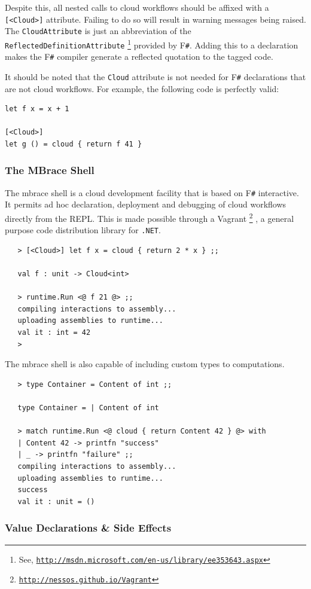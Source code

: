 \documentclass[9pt,a4paper]{article}
\newcommand{\mbrace}{mbrace}
\newcommand{\TitularMbrace}{MBrace}
\newcommand{\fsharp}{F\texttt \#}
\newcommand{\dotnet}{\texttt{\hbox{.}NET}}
\newcommand{\samehref}[1]{\href{#1}{\texttt{#1}}}
\begin{document}
Despite this, all nested calls to cloud workflows should be affixed with a \texttt{[<Cloud>]}
attribute. Failing to do so will result in warning messages being raised.
The \texttt{CloudAttribute} is just an abbreviation of the \texttt{ReflectedDefinitionAttribute}%
\footnote{See, \samehref{http://msdn.microsoft.com/en-us/library/ee353643.aspx}}
provided by \fsharp{}. Adding this to a declaration makes the \fsharp{} compiler generate a 
reflected quotation to the tagged code.

It should be noted that the \texttt{Cloud} attribute is not needed for \fsharp{} declarations 
that are not cloud workflows. For example, the following code is perfectly valid:
\begin{lstlisting}
let f x = x + 1

[<Cloud>]
let g () = cloud { return f 41 }
\end{lstlisting}

\subsubsection*{The \TitularMbrace{} Shell}

The \mbrace{} shell is a cloud development facility that is based on \fsharp{} interactive.
It permits ad hoc declaration, deployment and debugging of cloud workflows directly from the REPL. 
This is made possible through a Vagrant%
\footnote{\samehref{http://nessos.github.io/Vagrant}}
, a general purpose code distribution library for \dotnet{}.
\begin{verbatim}
   > [<Cloud>] let f x = cloud { return 2 * x } ;;

   val f : unit -> Cloud<int>

   > runtime.Run <@ f 21 @> ;;
   compiling interactions to assembly... 
   uploading assemblies to runtime... 
   val it : int = 42
   >
\end{verbatim}
The \mbrace{} shell is also capable of including custom types to computations.
\begin{verbatim}
   > type Container = Content of int ;;

   type Container = | Content of int

   > match runtime.Run <@ cloud { return Content 42 } @> with
   | Content 42 -> printfn "success"
   | _ -> printfn "failure" ;;
   compiling interactions to assembly... 
   uploading assemblies to runtime... 
   success
   val it : unit = ()
\end{verbatim}


\subsubsection*{Value Declarations \& Side Effects}
\end{document}
